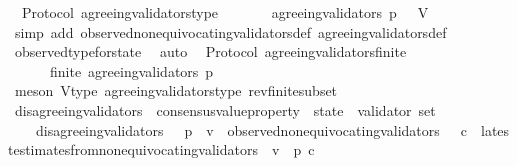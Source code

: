 \begin{isabellebody}
\isanewline
{}\isamarkupfalse%
\ {\isacharparenleft}\ Protocol{\isacharparenright}\ agreeing{\isacharunderscore}validators{\isacharunderscore}type\ {\isacharcolon}\isanewline
\ \ {\isachardoublequoteopen}{\isasymforall}\ {\isasymsigma}\ {\isasymin}\ {\isasymSigma}{\isachardot}\ agreeing{\isacharunderscore}validators\ {\isacharparenleft}p{\isacharcomma}\ {\isasymsigma}{\isacharparenright}\ {\isasymsubseteq}\ V{\isachardoublequoteclose}\isanewline
%
\isadelimproof
\ \ %
\endisadelimproof
%
\isatagproof
{}\isamarkupfalse%
\ {\isacharparenleft}simp\ add{\isacharcolon}\ observed{\isacharunderscore}non{\isacharunderscore}equivocating{\isacharunderscore}validators{\isacharunderscore}def\ agreeing{\isacharunderscore}validators{\isacharunderscore}def{\isacharparenright}\isanewline
\ \ \isamarkupfalse%
\ observed{\isacharunderscore}type{\isacharunderscore}for{\isacharunderscore}state\ \isamarkupfalse%
\ auto%
\endisatagproof
{\isafoldproof}%
%
\isadelimproof
\isanewline
%
\endisadelimproof
\isanewline
{}\isamarkupfalse%
\ {\isacharparenleft}\ Protocol{\isacharparenright}\ agreeing{\isacharunderscore}validators{\isacharunderscore}finite\ {\isacharcolon}\isanewline
\ \ {\isachardoublequoteopen}{\isasymforall}\ {\isasymsigma}\ {\isasymin}\ {\isasymSigma}{\isachardot}\ finite\ {\isacharparenleft}agreeing{\isacharunderscore}validators\ {\isacharparenleft}p{\isacharcomma}\ {\isasymsigma}{\isacharparenright}{\isacharparenright}{\isachardoublequoteclose}\isanewline
%
\isadelimproof
\ \ %
\endisadelimproof
%
\isatagproof
{}\isamarkupfalse%
\ {\isacharparenleft}meson\ V{\isacharunderscore}type\ agreeing{\isacharunderscore}validators{\isacharunderscore}type\ rev{\isacharunderscore}finite{\isacharunderscore}subset{\isacharparenright}%
\endisatagproof
{\isafoldproof}%
%
\isadelimproof
\isanewline
%
\endisadelimproof
\isanewline
\isanewline
{}\isamarkupfalse%
\ disagreeing{\isacharunderscore}validators\ {\isacharcolon}{\isacharcolon}\ {\isachardoublequoteopen}{\isacharparenleft}consensus{\isacharunderscore}value{\isacharunderscore}property\ {\isacharasterisk}\ state{\isacharparenright}\ {\isasymRightarrow}\ validator\ set{\isachardoublequoteclose}\isanewline
\ \ \isanewline
\ \ \ \ {\isachardoublequoteopen}disagreeing{\isacharunderscore}validators\ \ {\isacharequal}\ {\isacharparenleft}{\isasymlambda}{\isacharparenleft}p{\isacharcomma}\ {\isasymsigma}{\isacharparenright}{\isachardot}\ {\isacharbraceleft}v\ {\isasymin}\ observed{\isacharunderscore}non{\isacharunderscore}equivocating{\isacharunderscore}validators\ {\isasymsigma}{\isachardot}\ {\isasymexists}\ c\ {\isasymin}\ latest{\isacharunderscore}estimates{\isacharunderscore}from{\isacharunderscore}non{\isacharunderscore}equivocating{\isacharunderscore}validators\ {\isasymsigma}\ v{\isachardot}\ {\isasymnot}\ p\ c{\isacharbraceright}{\isacharparenright}{\isachardoublequoteclose}\isanewline

\end{isabellebody}
